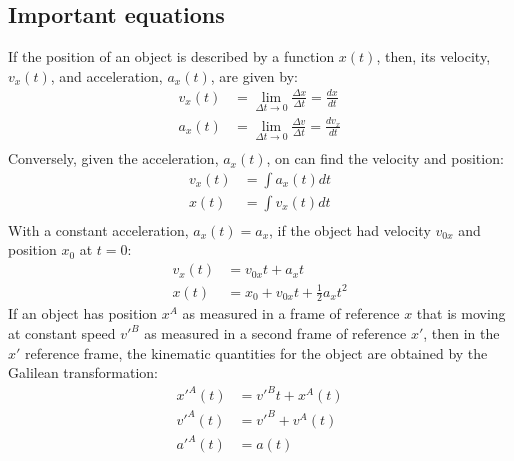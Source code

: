 \subsection{Important equations}
If the position of an object is described by a function $x(t)$, then, its velocity, $v_x(t)$, and acceleration, $a_x(t)$, are given by:
\begin{align*}
v_x(t)&=\lim_{\Delta t\to 0}\frac{\Delta x}{\Delta t}=\frac{dx}{dt}\\
a_x(t)&=\lim_{\Delta t\to 0}\frac{\Delta v}{\Delta t}=\frac{dv_x}{dt}\\
\end{align*}
Conversely, given the acceleration, $a_x(t)$, on can find the velocity and position:
\begin{align*}
v_x(t)&=\int a_x(t)dt\\
x(t)&=\int v_x(t)dt\\
\end{align*}
With a constant acceleration, $a_x(t)=a_x$, if the object had velocity $v_{0x}$ and position $x_0$ at $t=0$:
\begin{align*}
v_x(t)&=v_{0x}t+a_xt\\
x(t)&=x_0+v_{0x}t+\frac{1}{2}a_xt^2
\end{align*}
If an object has position $x^A$ as measured in a frame of reference $x$ that is moving at constant speed $v'^B$ as measured in a second frame of reference $x'$, then in the $x'$ reference frame, the kinematic quantities for the object are obtained by the Galilean transformation:
\begin{align*}
x'^A(t) &= v'^Bt + x^A(t)\\
v'^A(t) &=v'^B+v^A(t)\\
a'^A(t) &= a(t)
\end{align*}
